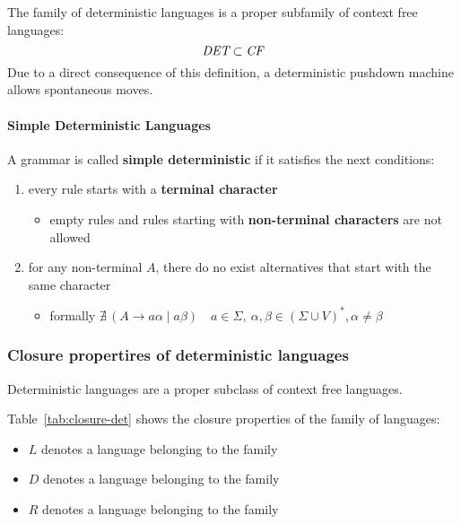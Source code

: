 \documentclass[english]{article}
\begin{document}
The family of deterministic languages is a proper subfamily of context free languages:
\[ \textit{DET} \subset \textit{CF} \]
Due to a direct consequence of this definition, a deterministic pushdown machine allows spontaneous moves.

\paragraph{Simple Deterministic Languages}

A grammar is called \textbf{simple deterministic} if it satisfies the next conditions:

\begin{enumerate}
  \item every rule \RP starts with a \textbf{terminal character}
        \begin{itemize}
          \item empty rules and rules starting with \textbf{non-terminal characters} are not allowed
        \end{itemize}
  \item for any non-terminal \(A\), there do no exist alternatives that start with the same character
        \begin{itemize}
          \item formally \(\nexists \, \left( A \rightarrow a \alpha \mid a \beta \right) \quad a \in \Sigma, \ \alpha, \beta \in \left( \Sigma \cup V \right)^\ast, \alpha \neq \beta\)
        \end{itemize}
\end{enumerate}

\subsubsection{Closure propertires of deterministic \CF languages}

Deterministic languages are a proper subclass of context free languages.

Table~\ref{tab:closure-det} shows the closure properties of the \DET family of languages:

\begin{itemize}
  \item \(L\) denotes a language belonging to the \CF family
  \item \(D\) denotes a language belonging to the \DET family
  \item \(R\) denotes a language belonging to the \REG family
\end{itemize}
\end{document}
